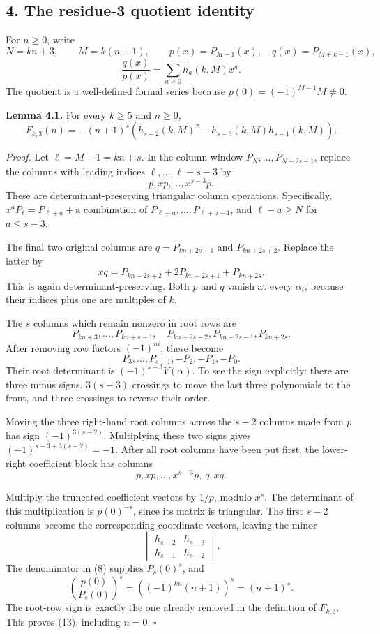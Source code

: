 \documentclass[
  11pt,
]{article}
\begin{document}
\subsection{4. The residue-3 quotient
identity}\label{the-residue-3-quotient-identity}

For \(n\ge0\), write \[
 N=kn+3,\qquad M=k(n+1),\qquad
 p(x)=P_{M-1}(x),\quad q(x)=P_{M+k-1}(x),
\] \[
 \frac{q(x)}{p(x)}=\sum_{a\ge0}h_a(k,M)x^a.
 \tag{12}
\] The quotient is a well-defined formal series because
\(p(0)=(-1)^{M-1}M\ne0\).

\textbf{Lemma 4.1.} For every \(k\ge5\) and \(n\ge0\), \[
 \boxed{\ F_{k,3}(n)=-(n+1)^s
 \left(h_{s-2}(k,M)^2-h_{s-3}(k,M)h_{s-1}(k,M)\right).\ }
 \tag{13}
\]

\emph{Proof.} Let \(\ell=M-1=kn+s\). In the column window
\(P_N,\ldots,P_{N+2s-1}\), replace the columns with leading indices
\(\ell,\ldots,\ell+s-3\) by \[
 p,xp,\ldots,x^{s-3}p.
\] These are determinant-preserving triangular column operations.
Specifically,
\(x^aP_\ell=P_{\ell+a}+\text{a combination of }P_{\ell-a},\ldots,P_{\ell+a-1}\),
and \(\ell-a\ge N\) for \(a\le s-3\).

The final two original columns are \(q=P_{kn+2s+1}\) and
\(P_{kn+2s+2}\). Replace the latter by \[
 xq=P_{kn+2s+2}+2P_{kn+2s+1}+P_{kn+2s}.
\] This is again determinant-preserving. Both \(p\) and \(q\) vanish at
every \(\alpha_i\), because their indices plus one are multiples of
\(k\).

The \(s\) columns which remain nonzero in root rows are \[
 P_{kn+3},\ldots,P_{kn+s-1},\quad
 P_{kn+2s-2},P_{kn+2s-1},P_{kn+2s}.
\] After removing row factors \((-1)^{ni}\), these become \[
 P_3,\ldots,P_{s-1},-P_2,-P_1,-P_0.
\] Their root determinant is \((-1)^{s-3}V(\alpha)\). To see the sign
explicitly: there are three minus signs, \(3(s-3)\) crossings to move
the last three polynomials to the front, and three crossings to reverse
their order.

Moving the three right-hand root columns across the \(s-2\) columns made
from \(p\) has sign \((-1)^{3(s-2)}\). Multiplying these two signs gives
\((-1)^{s-3+3(s-2)}=-1\). After all root columns have been put first,
the lower-right coefficient block has columns \[
 p,xp,\ldots,x^{s-3}p,\ q,xq.
\]

Multiply the truncated coefficient vectors by \(1/p\), modulo \(x^s\).
The determinant of this multiplication is \(p(0)^{-s}\), since its
matrix is triangular. The first \(s-2\) columns become the corresponding
coordinate vectors, leaving the minor \[
 \begin{vmatrix}
 h_{s-2}&h_{s-3}\\
 h_{s-1}&h_{s-2}
 \end{vmatrix}.
\] The denominator in (8) supplies \(P_s(0)^s\), and \[
 \left(\frac{p(0)}{P_s(0)}\right)^s
 =\left((-1)^{kn}(n+1)\right)^s=(n+1)^s.
\] The root-row sign is exactly the one already removed in the
definition of \(F_{k,3}\). This proves (13), including \(n=0\).
\(\square\)
\end{document}
